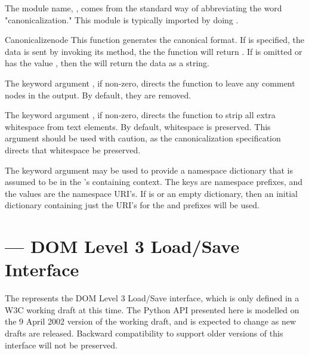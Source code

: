 \documentclass{howto}
\begin{document}
The module name, , comes from the standard way of abbreviating
the word "canonicalization."
This module is typically imported by doing
.

\begin{funcdesc}{Canonicalize}{node}
This function generates the canonical format.
If  is specified, the data is sent by invoking its
 method, the the function will return .
If  is omitted or has the value , then
the  will return the data as a string.

The keyword argument , if non-zero, directs the function
to leave any comment nodes in the output. By default, they are removed.

The keyword argument , if non-zero, directs the function
to strip all extra whitespace from text elements.
By default, whitespace is preserved.
This argument should be used with caution, as the canonicalization
specification directs that whitespace be preserved.

The keyword argument  may be used to provide a namespace
dictionary that is assumed to be in the 's containing
context.
The keys are namespace prefixes, and the values are the namespace URI's.
If  is  or an empty dictionary, then an initial
dictionary containing just the URI's for the  and 
prefixes will be used.
\end{funcdesc}


\section{ ---
         DOM Level 3 Load/Save Interface}



\begin{notice}[warning]
  The  represents the DOM Level 3 Load/Save
  interface, which is only defined in a W3C working draft at this
  time.  The Python API presented here is modelled on the 9 April 2002
  version of the working draft, and is expected to change as new
  drafts are released.  Backward compatibility to support older
  versions of this interface will not be preserved.
\end{notice}
\end{document}

